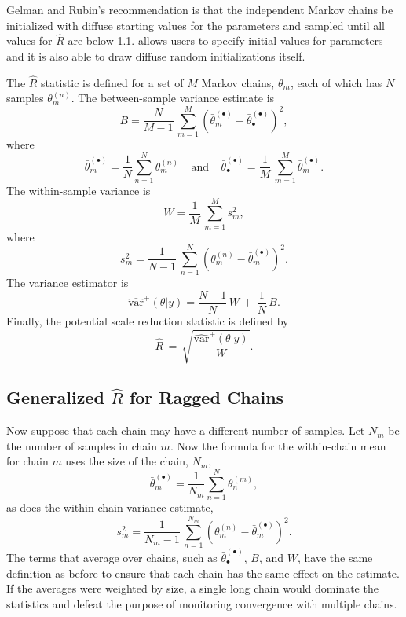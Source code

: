 Gelman and Rubin's recommendation is that the independent Markov
chains be initialized with diffuse starting values for the parameters
and sampled until all values for $\hat{R}$ are below 1.1.  \Stan
allows users to specify initial values for parameters and it is also
able to draw diffuse random initializations itself.

The $\hat{R}$ statistic is defined for a set of $M$ Markov chains,
$\theta_m$, each of which has $N$ samples $\theta^{(n)}_m$.  The
between-sample variance estimate is
\[
B
= \frac{N}{M-1} \, \sum_{m=1}^M (\bar{\theta}^{(\bullet)}_{m} - \bar{\theta}^{(\bullet)}_{\bullet})^2,
\]
%
where
%
\[
\bar{\theta}_m^{(\bullet)}
= \frac{1}{N} \sum_{n = 1}^N \theta_m^{(n)}
\ \ \ \ \
\mbox{and}
\ \ \ \ \
\bar{\theta}^{(\bullet)}_{\bullet}
= \frac{1}{M} \, \sum_{m=1}^M \bar{\theta}_m^{(\bullet)}.
\]
%
The within-sample variance is
\[
W 
= \frac{1}{M} \, \sum_{m=1}^M s_m^2,
\]
where
\[
s_m^2 = \frac{1}{N-1} \, \sum_{n=1}^N (\theta^{(n)}_m - \bar{\theta}^{(\bullet)}_m)^2.
\]
%
The variance estimator is
\[
\widehat{\mbox{var}}^{+}\!(\theta|y)
= \frac{N-1}{N}\, W \, + \, \frac{1}{N} \, B.
\]
%
Finally, the potential scale reduction statistic is defined by
\[
\hat{R} 
\, = \,
\sqrt{\frac{\widehat{\mbox{var}}^{+}\!(\theta|y)}{W}}.
\]

\subsection{Generalized $\hat{R}$ for Ragged Chains}

Now suppose that each chain may have a different number of samples.
Let $N_m$ be the number of samples in chain $m$.  Now the formula for
the within-chain mean for chain $m$ uses the size of the chain, $N_m$,
\[
\bar{\theta}_m^{(\bullet)}
= \frac{1}{N_m} \sum_{n = 1}^N \theta^{(m)}_n,
\]
as does the within-chain variance estimate,
\[
s_m^2 = \frac{1}{N_m-1} \, \sum_{n=1}^{N_m} (\theta^{(n)}_m - \bar{\theta}^{(\bullet)}_m)^2.
\]
The terms that average over chains, such as
$\bar{\theta}^{(\bullet)}_{\bullet}$, $B$, and $W$, have the same
definition as before to ensure that each chain has the same effect on
the estimate.  If the averages were weighted by size, a single long
chain would dominate the statistics and defeat the purpose of
monitoring convergence with multiple chains.

